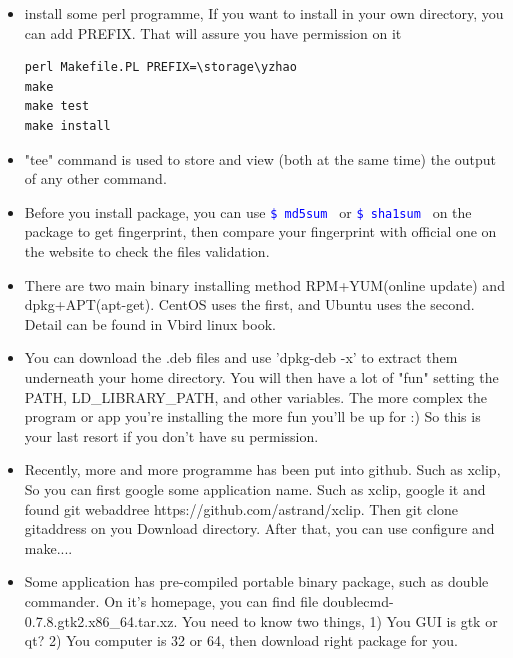 \documentclass[a4paper,11pt,twoside]{book}
\newcommand{\linuxcommand}[1]{\texttt{\textcolor{blue}{\$ #1 \Pisymbol{psy}{191}}}}
\begin{document}
\begin{itemize}
	 \item install some perl programme, If you want to install in your own directory, you can add PREFIX. That will assure you have permission on it
\begin{verbatim}
perl Makefile.PL PREFIX=\storage\yzhao
make
make test
make install
\end{verbatim}
		\item "tee" command is used to store and view (both at the same time) the output of any other command. 

		\item Before you install package, you can use \linuxcommand{md5sum} or \linuxcommand{sha1sum} on the package to get fingerprint, then compare your fingerprint with official one on the website to check the files validation.  
				
		\item There are two main binary installing method RPM+YUM(online update) and dpkg+APT(apt-get). CentOS uses the first, and Ubuntu uses the second. Detail can be found in Vbird linux book.

		\item  You can download the .deb files and use 'dpkg-deb -x' to extract them underneath your home directory. You will then have a lot of "fun" setting the PATH, LD\_LIBRARY\_PATH, and other variables. The more complex the program or app you're installing the more fun you'll be up for :) So this is your last resort if you don't have su permission.

		\item Recently, more and more programme has been put into github. Such as xclip, So you can first google some application name. Such as xclip, google it and found git webaddree https://github.com/astrand/xclip. Then git clone gitaddress on you Download directory. After that, you can use configure and make....

		\item Some application has pre-compiled portable binary package, such as double commander. On it's homepage, you can find file  doublecmd-0.7.8.gtk2.x86\_64.tar.xz. You need to know two things, 1) You GUI is gtk or qt? 2) You computer is 32 or 64, then download right package for you.
	\end{itemize}
\end{document}
